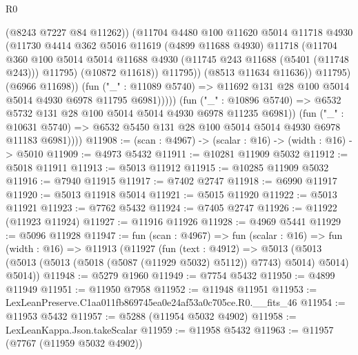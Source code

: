\begin{lexlean}{R0}
\begin{coremodule}
                              (@8243 @7227 @84 @11262))
                            (@11704
                              @4480
                              @100
                              @11620
                              @5014
                              @11718
                              @4930
                              (@11730
                                @4414
                                @362
                                @5016
                                @11619
                                (@4899 @11688 @4930)
                                @11718
                                (@11704
                                  @360
                                  @100
                                  @5014
                                  @5014
                                  @11688
                                  @4930
                                  (@11745 @243 @11688 (@5401 (@11748 @243)))
                                  @11795)
                                (@10872 @11618))
                              @11795))
                          (@8513 @11634 @11636))
                        @11795)
                      (@6966 @11698))
                    (fun ("_" : @11089 @5740) =>
                    @11692 @131 @28 @100 @5014 @5014 @4930 @6978 @11795 @6981)))))
            (fun ("_" : @10896 @5740) =>
            @6532 @5732 @131 @28 @100 @5014 @5014 @4930 @6978 @11235 @6981))
          (fun ("_" : @10631 @5740) =>
          @6532 @5450 @131 @28 @100 @5014 @5014 @4930 @6978 @11183 @6981))))
@11908 := (scan : @4967) -> (scalar : @16) -> (width : @16) -> @5010
@11909 := @4973 @5432
@11911 := @10281 @11909 @5032
@11912 := @5018 @11911
@11913 := @5013 @11912
@11915 := @10285 @11909 @5032
@11916 := @7940 @11915
@11917 := @7402 @2747
@11918 := @6990 @11917
@11920 := @5013 @11918 @5014
@11921 := @5015 @11920
@11922 := @5013 @11921
@11923 := @7762 @5432
@11924 := @7405 @2747
@11926 := @11922 (@11923 @11924)
@11927 := @11916 @11926
@11928 := @4969 @5441
@11929 := @5096 @11928
@11947 := fun (scan : @4967) =>
  fun (scalar : @16) =>
  fun (width : @16) =>
  @11913
    (@11927
      (fun (text : @4912) =>
      @5013 (@5013 (@5013 (@5013 (@5018 (@5087 (@11929 @5032) @5112)) @7743) @5014) @5014) @5014))
@11948 := @5279 @1960
@11949 := @7754 @5432
@11950 := @4899 @11949
@11951 := @11950 @7958
@11952 := @11948 @11951
@11953 := LexLeanPreserve.C1aa011fb869745ea0e24af53a0c705ce.R0.__fits_46
@11954 := @11953 @5432
@11957 := @5288 (@11954 @5032 @4902)
@11958 := LexLeanKappa.Json.takeScalar
@11959 := @11958 @5432
@11963 := @11957 (@7767 (@11959 @5032 @4902))

\end{coremodule}
\end{lexlean}
